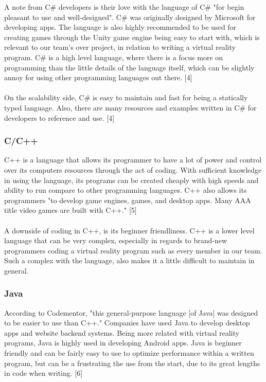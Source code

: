 \documentclass[letterpaper,10pt,onecolumn,compsoc]{IEEEtran}
\begin{document}

\noindent
A note from C\# developers is their love with the language of C\# "for begin pleasant to use and well-designed". C\# was originally designed by Microsoft for developing apps. The language is also highly recommended to be used for creating games through the Unity game engine being easy to start with, which is relevant to our team's over project, in relation to writing a virtual reality program. C\# is a high level language, where there is a focus more on programming than the little details of the language itself, which can be slightly annoy for using other programming languages out there. [4]
\\ ~ \\
On the scalability side, C\# is easy to maintain and fast for being a statically typed language. Also, there are many resources and examples written  in C\# for developers to reference and use. [4]

\subsubsection{C/C++}


\noindent
C++ is a language that allows its programmer to have a lot of power and control over its computers resources through the act of coding. With sufficient knowledge in using the language, its programs can be created cheaply with high speeds and ability to run compare to other programming languages. C++ also allows its programmers "to develop game engines, games, and desktop apps. Many AAA title video games are built with C++." [5]
\\ ~ \\
A downside of coding in C++, is its beginner friendliness. C++ is a lower level language that can be very complex, especially in regards to brand-new programmers coding a virtual reality program such as every member in our team. Such a complex with the language, also makes it a little difficult to maintain in general.

\subsubsection{Java}


\noindent
According to Codementor, "this general-purpose language [of Java] was designed to be easier to use than C++." Companies have used Java to develop desktop apps and website backend systems. Being more related with virtual reality programs, Java is highly used in developing Android apps. Java is beginner friendly and can be fairly easy to use to optimize performance within a written program, but can be a frustrating the use from the start, due to its great lengths in code when writing. [6]
\end{document}
